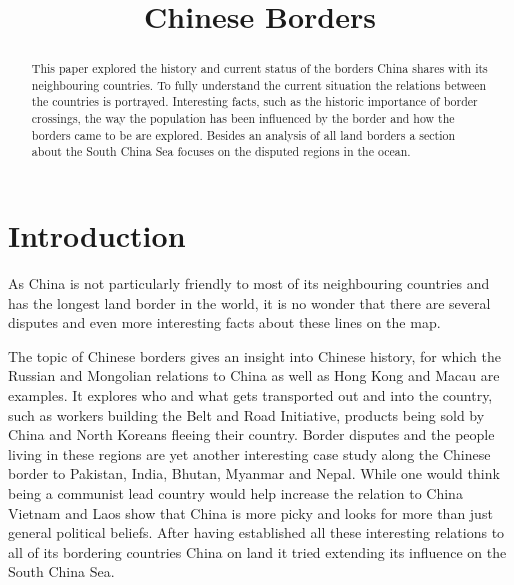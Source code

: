 \documentclass[conference]{IEEEtran}
\begin{document}
	
	\title{Chinese Borders}
	
	\author{
	}
	
	\maketitle
	
	\begin{abstract}
		This paper explored the history and current status of the borders China shares with its neighbouring countries. To fully understand the current situation the relations between the countries is portrayed. Interesting facts, such as the historic importance of border crossings, the way the population has been influenced by the border and how the borders came to be are explored. Besides an analysis of all land borders a section about the South China Sea focuses on the disputed regions in the ocean.
	\end{abstract}
	\section{Introduction}
	As China is not particularly friendly to most of its neighbouring countries and has the longest land border in the world, it is no wonder that there are several disputes and even more interesting facts about these lines on the map.
	
	The topic of Chinese borders gives an insight into Chinese history, for which the Russian and Mongolian relations to China as well as Hong Kong and Macau are examples. It explores who and what gets transported out and into the country, such as workers building the Belt and Road Initiative, products being sold by China and North Koreans fleeing their country. Border disputes and the people living in these regions are yet another interesting case study along the Chinese border to Pakistan, India, Bhutan, Myanmar and Nepal. While one would think being a communist lead country would help increase the relation to China Vietnam and Laos show that China is more picky and looks for more than just general political beliefs. After having established all these interesting relations to all of its bordering countries China on land it tried extending its influence on the South China Sea. 
	
\end{document}
